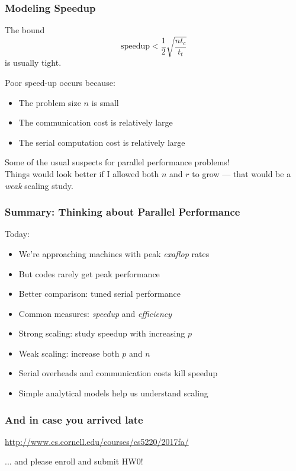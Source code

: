\documentclass{beamer}
\begin{document}
\begin{frame}
\frametitle{Modeling Speedup}

The bound
\[
  \mathrm{speedup} < 
  \frac{1}{2} \sqrt{\frac{n t_c}{t_t}} 
\]
is usually tight.
\vspace{5mm}

Poor speed-up occurs because:
\begin{itemize}
\item The problem size $n$ is small
\item The communication cost is relatively large
\item The serial computation cost is relatively large
\end{itemize}
Some of the usual suspects for parallel performance problems! \\[5mm]
Things would look better if I allowed both $n$ and $r$ to grow ---
that would be a {\em weak} scaling study.

\end{frame}

\begin{frame}
  \frametitle{Summary: Thinking about Parallel Performance}

  Today:
  \begin{itemize}
  \item We're approaching machines with peak {\em exaflop} rates
  \item But codes rarely get peak performance
  \item Better comparison: tuned serial performance
  \item Common measures: {\em speedup} and {\em efficiency}
  \item Strong scaling: study speedup with increasing $p$
  \item Weak scaling: increase both $p$ and $n$
  \item Serial overheads and communication costs kill speedup
  \item Simple analytical models help us understand scaling
  \end{itemize}
\end{frame}

\begin{frame}
  \frametitle{And in case you arrived late}

  \begin{center}
    {\small \url{http://www.cs.cornell.edu/courses/cs5220/2017fa/}}

    \vspace{1cm}
      ... and please enroll and submit HW0!
  \end{center}
  
\end{frame}
\end{document}
